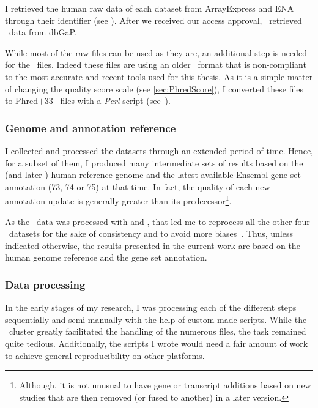 I retrieved the human raw data of each dataset from \gls{ArrayExpress} and
\gls{ENA} through their identifier (see ). After we
received our access approval, \nuno\ retrieved \Gtex\ data from
\gls{dbGaP}.

While most of the raw files can be used as they are, an additional step is
needed for the \castle\ files. Indeed these files are using an older
\fastq\ format that is non-compliant to the most accurate and recent tools used
for this thesis.
As it is a simple matter of changing the quality score scale
(see \cref{sec:PhredScore}),
I converted these files to \gls{Phred}$+33$ \fastq\ files with a
\emph{\gls{Perl}} script (see~).

\subsubsection{Genome and annotation reference}

I collected and processed the datasets through an extended period of time.
Hence, for a subset of them,
I produced many intermediate sets of results based on the 
(and later ) human reference genome and the latest available
\gls{Ensembl} gene set annotation (73, 74 or 75) at that time.
In fact, the quality of each new annotation update is
generally greater than its predecessor\footnote{Although,
it is not unusual to have gene or transcript additions based on new studies
that are then removed (or fused to another) in a later version.
}.

As the \gtex\ data was processed with  and , that led me
to reprocess all the other four \Rnaseq\ datasets for the sake of consistency and
to avoid more biases~. Thus, unless indicated
otherwise, the results presented in the current work are
based on the  human genome reference and the  gene set annotation.


\subsubsection{Data processing}

In the early stages of my research, I was processing each of the different steps
sequentially and semi-manually with the help of custom made scripts. While the
\EBI\ \gls{cluster} greatly facilitated the handling of the numerous files,
the task remained quite tedious.
Additionally,
the scripts I wrote would need a fair amount of work to achieve general
reproducibility on other platforms.

